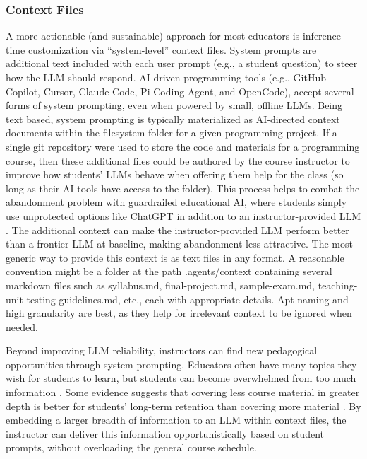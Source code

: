 \subsubsection{Context Files}\label{context-files}

A more actionable (and sustainable) approach for most educators is inference-time customization via ``system-level'' context files. System prompts are additional text included with each user prompt (e.g., a student question) to steer how the LLM should respond. AI-driven programming tools (e.g., GitHub Copilot, Cursor, Claude Code, Pi Coding Agent, and OpenCode), accept several forms of system prompting, even when powered by small, offline LLMs. Being text based, system prompting is typically materialized as AI-directed context documents within the filesystem folder for a given programming project. If a single git repository were used to store the code and materials for a programming course, then these additional files could be authored by the course instructor to improve how students' LLMs behave when offering them help for the class (so long as their AI tools have access to the folder). This process helps to combat the abandonment problem with guardrailed educational AI, where students simply use unprotected options like ChatGPT in addition to an instructor-provided LLM \cite{kazemitabaarCodeAidEvaluatingClassroom2024}. The additional context can make the instructor-provided LLM perform better than a frontier LLM at baseline, making abandonment less attractive. The most generic way to provide this context is as text files in any format. A reasonable convention might be a folder at the path .agents/context containing several markdown files such as syllabus.md, final-project.md, sample-exam.md, teaching-unit-testing-guidelines.md, etc., each with appropriate details. Apt naming and high granularity are best, as they help for irrelevant context to be ignored when needed.

Beyond improving LLM reliability, instructors can find new pedagogical opportunities through system prompting. Educators often have many topics they wish for students to learn, but students can become overwhelmed from too much information \cite{swellerCognitiveLoadTheory2011}. Some evidence suggests that covering less course material in greater depth is better for students' long-term retention than covering more material \cite{schuetzeOptimalLearningTime2022,schwartzDepthBreadthHow2009}. By embedding a larger breadth of information to an LLM within context files, the instructor can deliver this information opportunistically based on student prompts, without overloading the general course schedule.

